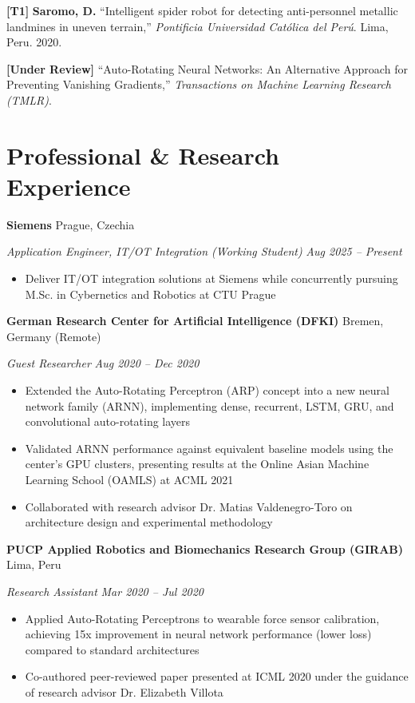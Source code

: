 \documentclass[11pt,letterpaper]{article}
\newcommand{\entry}[4]{%
  \noindent\textbf{#1} \hfill #2 \par\nopagebreak
  \textit{#3} \hfill \textit{#4} \par\nopagebreak
}
\begin{document}
\noindent\textbf{[T1]} \textbf{Saromo, D.} ``Intelligent spider robot for detecting anti-personnel metallic landmines in uneven terrain,'' \textit{Pontificia Universidad Cat\'{o}lica del Per\'{u}}. Lima, Peru. 2020.\par\vspace{3pt}

\noindent\textbf{[Under Review]} ``Auto-Rotating Neural Networks: An Alternative Approach for Preventing Vanishing Gradients,'' \textit{Transactions on Machine Learning Research (TMLR)}.\par
\vspace{0.3em}

\section{Professional \& Research Experience}

\entry{Siemens}{Prague, Czechia}{Application Engineer, IT/OT Integration (Working Student)}{Aug 2025 -- Present}
\begin{itemize}
  \item Deliver IT/OT integration solutions at Siemens while concurrently pursuing M.Sc. in Cybernetics and Robotics at CTU Prague
\end{itemize}
\vspace{0.3em}

\entry{German Research Center for Artificial Intelligence (DFKI)}{Bremen, Germany (Remote)}{Guest Researcher}{Aug 2020 -- Dec 2020}
\begin{itemize}
  \item Extended the Auto-Rotating Perceptron (ARP) concept into a new neural network family (ARNN), implementing dense, recurrent, LSTM, GRU, and convolutional auto-rotating layers
  \item Validated ARNN performance against equivalent baseline models using the center's GPU clusters, presenting results at the Online Asian Machine Learning School (OAMLS) at ACML 2021
  \item Collaborated with research advisor Dr. Matias Valdenegro-Toro on architecture design and experimental methodology
\end{itemize}
\vspace{0.3em}

\entry{PUCP Applied Robotics and Biomechanics Research Group (GIRAB)}{Lima, Peru}{Research Assistant}{Mar 2020 -- Jul 2020}
\begin{itemize}
  \item Applied Auto-Rotating Perceptrons to wearable force sensor calibration, achieving 15x improvement in neural network performance (lower loss) compared to standard architectures
  \item Co-authored peer-reviewed paper presented at ICML 2020 under the guidance of research advisor Dr. Elizabeth Villota
\end{itemize}
\vspace{0.3em}
\end{document}
